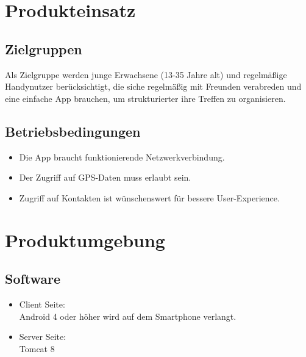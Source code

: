 \documentclass[parskip=full]{scrartcl}
\begin{document}
\newpage
\section{Produkteinsatz}
\subsection{Zielgruppen}
% 
Als Zielgruppe werden junge Erwachsene (13-35 Jahre alt) und regelmäßige Handynutzer berücksichtigt, die siche regelmäßig mit Freunden verabreden und eine einfache App brauchen, um strukturierter ihre Treffen zu organisieren.

\subsection{Betriebsbedingungen}
\begin{itemize}
\item Die App braucht funktionierende Netzwerkverbindung.\\
\item Der Zugriff auf GPS-Daten muss erlaubt sein.\\
\item Zugriff auf Kontakten ist wünschenswert für bessere User-Experience. %
\end{itemize}

\newpage
\section{Produktumgebung}

\subsection{Software}
\begin{itemize}
	\item Client Seite:\\
	Android 4 oder höher wird auf dem Smartphone verlangt.
	\item Server Seite:\\
	Tomcat 8 
\end{itemize}
\end{document}
